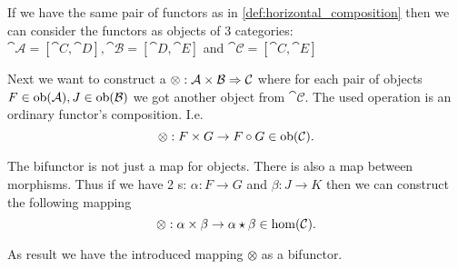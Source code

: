 



\begin{remark}
 \label{rem:bifunctor_fun_cat}
If we have the same pair of functors as in
\cref{def:horizontal_composition} then we can consider the functors as
objects of 3 categories: $\cat{\mathcal{A}} = \left[\cat{C},
  \cat{D}\right], \cat{\mathcal{B}} = \left[\cat{D},
  \cat{E}\right]$ and $\cat{\mathcal{C}} = \left[\cat{C},
  \cat{E}\right]$ 

  Next we want to construct a  
  $\otimes: \mathbf{\mathcal{A}} \times \mathbf{\mathcal{B}} \Rightarrow \mathbf{\mathcal{C}}$
  where for each pair of objects $F \in \mathrm{ob}(\mathbf{\mathcal{A}}), J \in
  \mathrm{ob}(\mathbf{\mathcal{B}})$ we got another object from $\cat{\mathcal{C}}$.
  The used operation is an ordinary functor's composition.
  I.e.
  \[
  \otimes: F \times G \to F \circ G \in \mathrm{ob}(\mathbf{\mathcal{C}}).
  \]
  
  The bifunctor is not just a map for objects. There is also a map
  between morphisms. Thus if we have 2 s:
  $\alpha : F \to G$ and $\beta : J \to K$ then we can construct the
  following mapping 
  \[
  \otimes: \alpha \times \beta \to \alpha \star \beta \in \mathrm{hom}(\mathbf{\mathcal{C}}).
  \]
  
  As result we have the introduced mapping $\otimes$ as a bifunctor.
\end{remark}

